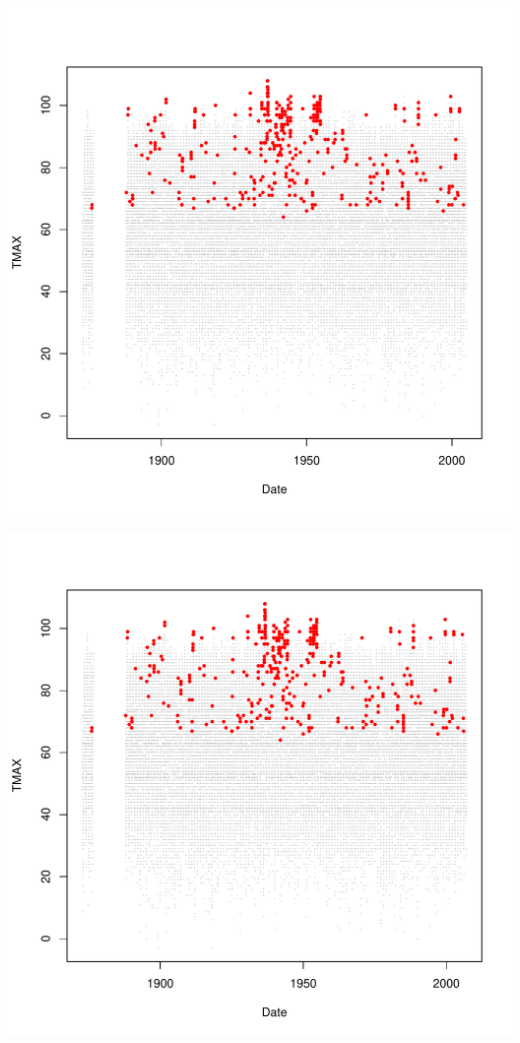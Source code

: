 \documentclass{article}\usepackage[]{graphicx}\usepackage[]{color}
\makeatletter
\def\maxwidth{ %
  \ifdim\Gin@nat@width>\linewidth
    \linewidth
  \else
    \Gin@nat@width
  \fi
}
\newenvironment{knitrout}{}{} %
\makeatother
\begin{document}
\begin{knitrout}
\includegraphics[width=\maxwidth]{figure/unnamed-chunk-4-62} 

\includegraphics[width=\maxwidth]{figure/unnamed-chunk-4-63} 


\end{knitrout}
\end{document}
